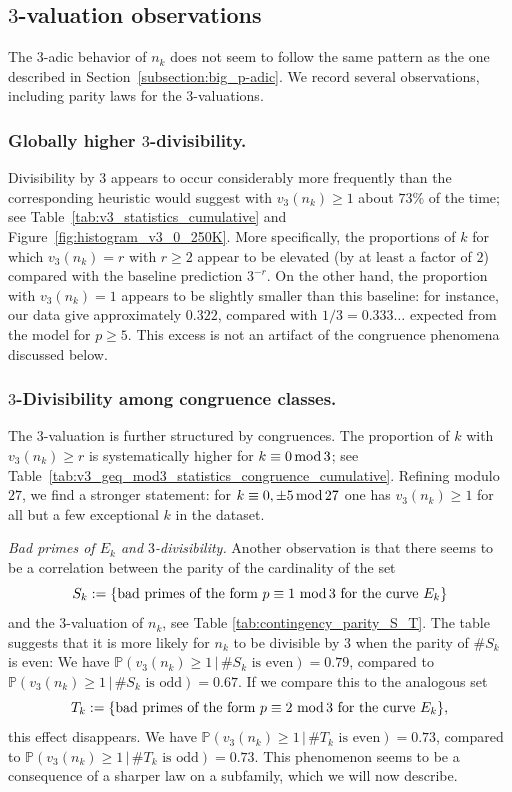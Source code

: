 \documentclass[12pt]{amsart}%
\renewcommand{\pmod}[1]{\hspace{0.05em}(\mathrm{mod}\,#1)}
\newcommand{\1}{\mathds{1}}
\renewcommand{\pmod}[1]{\,{\rm mod}\,#1}
\theoremstyle{definition}
\numberwithin{equation}{section}
\numberwithin{table}{section}
\numberwithin{figure}{section}
\begin{document}
\subsection{$3$-valuation observations}
The $3$-adic behavior of $n_k$ does not seem to follow the same pattern as the one described in Section~\ref{subsection:big_p-adic}. We record several observations, including parity laws for the $3$-valuations.

\subsubsection*{Globally higher $3$-divisibility.}

Divisibility by $3$ appears to occur considerably more frequently than the corresponding heuristic would suggest with $v_3(n_k)\geq 1$ about $73\%$ of the time; see  Table~\ref{tab:v3_statistics_cumulative} and Figure~\ref{fig:histogram_v3_0_250K}. More specifically, the proportions of $k$ for which $v_3(n_k)=r$ with $r \geq 2$ appear to be elevated (by at least a factor of $2$) compared with the baseline prediction $3^{-r}$. On the other hand, the proportion with $v_3(n_k)=1$ appears to be slightly smaller than this baseline: for instance, our data give approximately $0.322$, compared with $1/3 = 0.333\ldots$ expected from the model for $p\geq 5$. This excess is not an artifact of
the congruence phenomena discussed below.

\subsubsection*{$3$-Divisibility among congruence classes.}

The $3$-valuation is further structured by congruences. The proportion of $k$ with
$v_3(n_k)\geq r$ is systematically higher for $k\equiv 0\pmod 3$; see
Table~\ref{tab:v3_geq_mod3_statistics_congruence_cumulative}. Refining modulo $27$, we
find a stronger statement: for $k\equiv 0,\pm 5\pmod{27}$
one has $v_3(n_k)\geq 1$ for all but a few exceptional $k$ in the dataset.


\medskip
\noindent\emph{Bad primes of $E_k$ and $3$-divisibility.} Another observation is that there seems to be a correlation between the parity of the cardinality of the set
\[
S_k := \{ \text{bad primes of the form }p \equiv 1 \, \pmod 3 \text{ for the curve }E_k \}
\]
and the $3$-valuation of $n_k$, see Table \ref{tab:contingency_parity_S_T}. The table suggests that it is more likely for $n_k$ to be divisible by $3$ when the parity of $\#S_k$ is even: We have $\mathbb{P}(v_3(n_k) \geq 1 \, | \, \# S_k \text{ is even}) = 0.79$, compared to $\mathbb{P}(v_3(n_k) \geq 1 \, | \, \# S_k \text{ is odd}) = 0.67 $.%
If we compare this to the analogous set
\[
T_k := \{ \text{bad primes of the form }p \equiv 2 \, \pmod 3 \text{ for the curve }E_k \},
\]
this effect disappears. We have $\mathbb{P}(v_3(n_k) \geq 1 \, | \, \# T_k \text{ is even}) = 0.73$, compared to $\mathbb{P}(v_3(n_k) \geq 1 \, | \, \# T_k \text{ is odd}) = 0.73$.
This phenomenon seems to be a consequence of a sharper law on a subfamily, which we will now describe.
\end{document}
